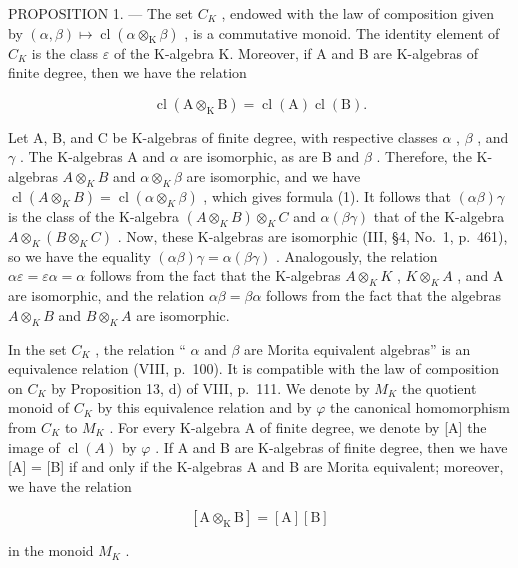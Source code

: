 PROPOSITION 1. --- The set \(C_{K}\) , endowed with the law of composition given by \((\alpha, \beta) \mapsto \operatorname{cl}(\alpha \otimes_{\mathrm{K}} \beta)\) , is a commutative monoid. The identity element of \(C_{K}\) is the class \(\varepsilon\) of the K-algebra K. Moreover, if A and B are K-algebras of finite degree, then we have the relation

\[
\operatorname{cl} (\mathrm{A} \otimes_ {\mathrm{K}} \mathrm{B}) = \operatorname{cl} (\mathrm{A}) \operatorname{cl} (\mathrm{B}).\tag{1}
\]

Let A, B, and C be K-algebras of finite degree, with respective classes \(\alpha\) , \(\beta\) , and \(\gamma\) . The K-algebras A and \(\alpha\) are isomorphic, as are B and \(\beta\) . Therefore, the K-algebras \(A \otimes_{K} B\) and \(\alpha \otimes_{K} \beta\) are isomorphic, and we have \(\operatorname{cl}(A \otimes_{K} B) = \operatorname{cl}(\alpha \otimes_{K} \beta)\) , which gives formula (1). It follows that \((\alpha\beta)\gamma\) is the class of the K-algebra \((A \otimes_{K} B) \otimes_{K} C\) and \(\alpha(\beta\gamma)\) that of the K-algebra \(A \otimes_{K} (B \otimes_{K} C)\) . Now, these K-algebras are isomorphic (III, §4, No.~1, p.~461), so we have the equality \((\alpha\beta)\gamma = \alpha(\beta\gamma)\) . Analogously, the relation \(\alpha\varepsilon = \varepsilon\alpha = \alpha\) follows from the fact that the K-algebras \(A \otimes_{K} K\) , \(K \otimes_{K} A\) , and A are isomorphic, and the relation \(\alpha\beta = \beta\alpha\) follows from the fact that the algebras \(A \otimes_{K} B\) and \(B \otimes_{K} A\) are isomorphic.

In the set \(C_{K}\) , the relation `` \(\alpha\) and \(\beta\) are Morita equivalent algebras'' is an equivalence relation (VIII, p.~100). It is compatible with the law of composition on \(C_{K}\) by Proposition 13, d) of VIII, p.~111. We denote by \(M_{K}\) the quotient monoid of \(C_{K}\) by this equivalence relation and by \(\varphi\) the canonical homomorphism from \(C_{K}\) to \(M_{K}\) . For every K-algebra A of finite degree, we denote by {[}A{]} the image of \(\operatorname{cl}(A)\) by \(\varphi\) . If A and B are K-algebras of finite degree, then we have {[}A{]} = {[}B{]} if and only if the K-algebras A and B are Morita equivalent; moreover, we have the relation

\[
[ \mathrm{A} \otimes_ {\mathrm{K}} \mathrm{B} ] = [ \mathrm{A} ] [ \mathrm{B} ]\tag{2}
\]

in the monoid \(M_{K}\) .

